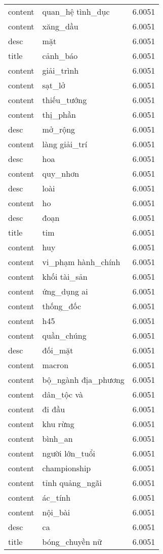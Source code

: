 \documentclass{article}
\begin{document}
\begin{tabular}{lll}
content & quan\_hệ tình\_dục & 6.0051\\
content & xăng\_dầu & 6.0051\\
desc & mặt & 6.0051\\
title & cảnh\_báo & 6.0051\\
content & giải\_trình & 6.0051\\
content & sạt\_lở & 6.0051\\
content & thiếu\_tướng & 6.0051\\
content & thị\_phần & 6.0051\\
desc & mở\_rộng & 6.0051\\
content & làng giải\_trí & 6.0051\\
desc & hoa & 6.0051\\
content & quy\_nhơn & 6.0051\\
desc & loài & 6.0051\\
content & ho & 6.0051\\
desc & đoạn & 6.0051\\
title & tim & 6.0051\\
content & huy & 6.0051\\
content & vi\_phạm hành\_chính & 6.0051\\
content & khối tài\_sản & 6.0051\\
content & ứng\_dụng ai & 6.0051\\
content & thống\_đốc & 6.0051\\
content & h45 & 6.0051\\
content & quần\_chúng & 6.0051\\
desc & đối\_mặt & 6.0051\\
content & macron & 6.0051\\
content & bộ\_ngành địa\_phương & 6.0051\\
content & dân\_tộc và & 6.0051\\
content & đi đầu & 6.0051\\
content & khu rừng & 6.0051\\
content & bình\_an & 6.0051\\
content & người lớn\_tuổi & 6.0051\\
content & championship & 6.0051\\
content & tỉnh quảng\_ngãi & 6.0051\\
content & ác\_tính & 6.0051\\
content & nội\_bài & 6.0051\\
desc & ca & 6.0051\\
title & bóng\_chuyền nữ & 6.0051\\

\end{tabular}
\end{document}
